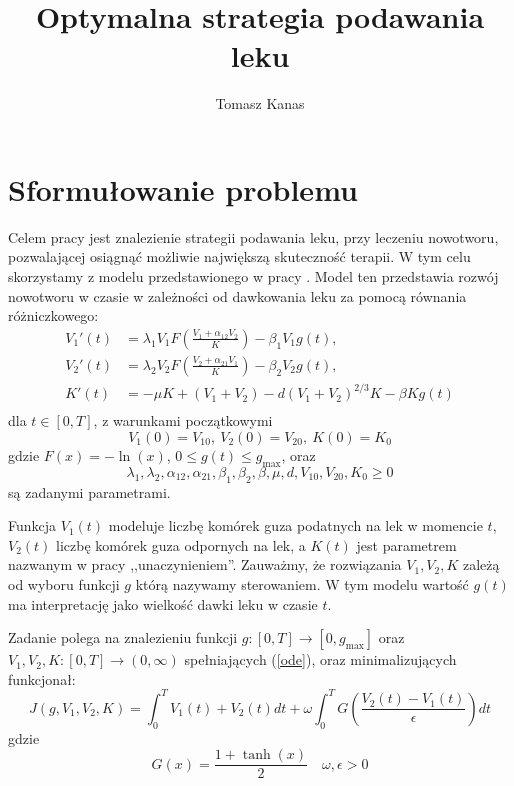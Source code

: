 \documentclass[11pt]{article}
\title{Optymalna strategia podawania leku}
\author{Tomasz Kanas}
\begin{document}
\maketitle

\section{Sformułowanie problemu}
Celem pracy jest znalezienie strategii podawania leku, przy leczeniu nowotworu, pozwalającej osiągnąć możliwie największą skuteczność terapii. W tym celu skorzystamy z modelu przedstawionego w pracy \cite{BBF-manuscript}. Model ten przedstawia rozwój nowotworu w czasie w zależności od dawkowania leku za pomocą równania różniczkowego:
\begin{equation} \label{ode}
  \begin{aligned} 
    V_1'(t) &= \lambda_1V_1F\left(\frac{V_1 + \alpha_{12}V_2}{K}\right) - \beta_1V_1g(t), \\
    V_2'(t) &= \lambda_2V_2F\left(\frac{V_2 + \alpha_{21}V_1}{K}\right) - \beta_2V_2g(t), \\
    K'(t) &= -\mu K + (V_1+V_2) - d{(V_1 + V_2)}^{2/3}K - \beta K g(t) \\
  \end{aligned}
\end{equation}
dla $t \in [0, T]$, z warunkami początkowymi
\begin{equation} \label{ode-start}
   V_1(0) = V_{10},\ V_2(0) = V_{20},\ K(0) = K_0
\end{equation}
gdzie $F(x) = -\ln(x)$, $ 0 \le g(t) \le g_{\max}$, oraz
\[\lambda_1, \lambda_2, \alpha_{12}, \alpha_{21}, \beta_1, \beta_2, \beta, \mu, d, V_{10}, V_{20}, K_0 \ge 0\]
są zadanymi parametrami.

Funkcja $V_1(t)$ modeluje liczbę komórek guza podatnych na lek w momencie $t$, $V_2(t)$ liczbę komórek guza odpornych na lek, a $K(t)$ jest parametrem nazwanym w pracy ,,unaczynieniem''. Zauważmy, że rozwiązania $V_1, V_2, K$ zależą od wyboru funkcji $g$ którą nazywamy sterowaniem. W tym modelu wartość $g(t)$ ma interpretację jako wielkość dawki leku w czasie $t$.

Zadanie polega na znalezieniu funkcji $g: [0, T] \to [0, g_{\max}]$ oraz $V_1, V_2, K: [0, T] \to (0, \infty)$ spełniających (\ref{ode}), oraz minimalizujących funkcjonał:
\begin{equation} \label{objf}
  J(g, V_1, V_2, K) = \int_0^T V_1(t) + V_2(t)dt + \omega\int_0^T G\left(\frac{V_2(t) - V_1(t)}{\epsilon}\right) dt
\end{equation}
gdzie
\begin{equation*}
  G(x) = \frac{1+\tanh(x)}{2} \quad
  \omega, \epsilon > 0 
\end{equation*}
\end{document}
